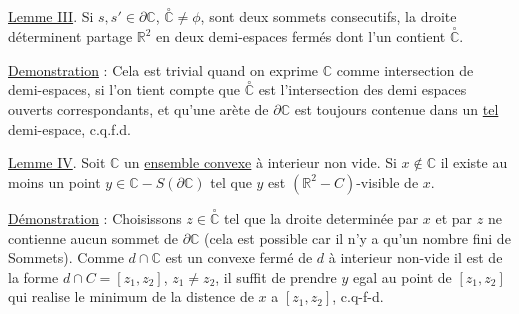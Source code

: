 \uline{Lemme III}. Si $s,s'\in\partial\mathbb{C}$, $\overset{\circ}{\mathbb{C}}\ne\phi$, sont deux sommets consecutifs, la droite   déterminent partage $\mathbb{R}^{2}$ en deux demi-espaces fermés dont l'un contient $\overset{\circ}{\mathbb{C}}$.

%
\uline{Demonstration} : Cela est trivial quand on exprime $\mathbb{C}$ comme intersection de demi-espaces, si l'on tient compte que $\overset{\circ}{\mathbb{C}}$ est l'intersection des demi espaces ouverts correspondants, et qu'une arète de $\partial\mathbb{C}$ est toujours contenue dans un \uline{tel} demi-espace, c.q.f.d.

\uline{Lemme IV}. Soit $\mathbb{C}$ un \uline{ensemble convexe} à interieur non vide. Si $x\notin\mathbb{C}$ il existe au moins un point $y\in\mathbb{C}-S(\partial\mathbb{C})$ tel que $y$ est $(\mathbb{R}^{2}-C)$-visible de $x$.

\uline{Démonstration} : Choisissons $z\in\overset{\circ}{\mathbb{C}}$ tel que la droite determinée par $x$ et par $z$  ne contienne aucun sommet de $\partial\mathbb{C}$ (cela est possible car il n'y a qu'un nombre fini de Sommets). Comme $d\cap\mathbb{C}$ est un convexe fermé de $d$ à interieur  non-vide il est de la forme $d\cap C=[z_{1},z_{2}]$, $z_{1}\ne z_{2}$, il suffit de prendre $y$  egal au point de $[z_{1},z_{2}]$ qui realise le minimum de la distence de $x$ a $[z_{1},z_{2}]$, c.q-f-d.
\margin{!}

